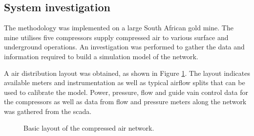 	\subsection{System investigation}
	The methodology was implemented on a large South African gold mine. The mine utilises five compressors supply compressed air to various surface and underground operations. An investigation was performed to gather the data and information required to build a simulation model of the network.
	\par 
	A air distribution layout was obtained, as shown in Figure \ref{fig: KUS Air layout}. The layout indicates available meters and instrumentation as well as typical airflow splits that can be used to calibrate the model. Power, pressure, flow  and guide vain control data for the compressors as well as data from flow and pressure meters along the network was gathered from the \gls{scada}.
	\begin{figure}[h!]
		\centering
		\caption{Basic layout of the compressed air network.}
		\label{fig: KUS Air layout}
	\end{figure}
\par 
		
